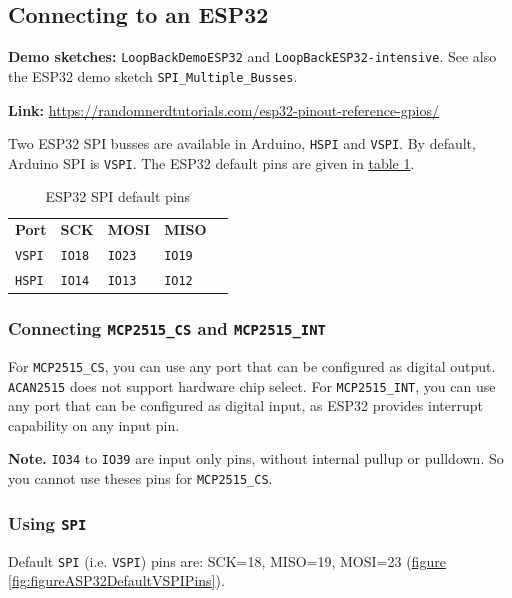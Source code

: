 \documentclass[10pt, a4paper, obeyspaces]{extarticle}
\newcommand \subsectionLabel[2]{\subsection{#1}\label{subsec:#2}}
\newcommand\labelTableau[1]{\label{tab:#1}}
\newcommand\refTableau[1]{\hyperref[tab:#1]{table \ref*{tab:#1}}}
\newcommand\refFigure[2]{\hyperref[fig:#2]{figure \ref*{fig:#2}{\ifthenelse{\equal{#1}{}}{}{.#1}}}}
\begin{document}
\subsectionLabel{Connecting to an ESP32}{connectionESP32}

{\bf Demo sketches: } \texttt{LoopBackDemoESP32} and \texttt{LoopBackESP32-intensive}. See also the ESP32 demo sketch \texttt{SPI\_Multiple\_Busses}.

{\bf Link:} \url{https://randomnerdtutorials.com/esp32-pinout-reference-gpios/}

Two ESP32 SPI busses are available in Arduino, \texttt{HSPI} and \texttt{VSPI}. By default, Arduino SPI is \texttt{VSPI}. The ESP32 default pins are given in \refTableau{ESP32SPIdefaultPins}.


\begin{table}[!ht]
  \small
  \onehalfspacing
  \centering
  \begin{tabular}{lllll}
    \textbf{Port} & \textbf{SCK} & \textbf{MOSI} & \textbf{MISO}\\
    \texttt{VSPI} & \texttt{IO18} & \texttt{IO23} & \texttt{IO19}\\
    \texttt{HSPI} & \texttt{IO14} & \texttt{IO13} & \texttt{IO12}\\
  \end{tabular}
  \caption{ESP32 SPI default pins}
  \labelTableau{ESP32SPIdefaultPins}
\end{table}



\subsubsection{Connecting \texttt{MCP2515\_CS} and \texttt{MCP2515\_INT}}
 For \texttt{MCP2515\_CS}, you can use any port that can be configured as digital output. \texttt{ACAN2515} does not support hardware chip select. For \texttt{MCP2515\_INT}, you can use any port that can be configured as digital input, as ESP32 provides interrupt capability on any input pin.
  
{\bf Note.} \texttt{IO34} to \texttt{IO39} are input only pins, without internal pullup or pulldown. So you cannot use theses pins for \texttt{MCP2515\_CS}.







\subsubsection{Using \texttt{SPI}}
  Default \texttt{SPI} (i.e. \texttt{VSPI}) pins are: SCK=18, MISO=19, MOSI=23 (\refFigure{}{figureASP32DefaultVSPIPins}).
  
\end{document}

